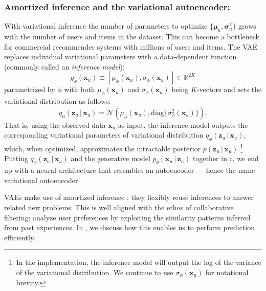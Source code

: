 \documentclass[sigconf]{acmart}
\newcommand{\mathbold}[1]{\ensuremath{\boldsymbol{\mathbf{#1}}}}
\DeclareRobustCommand{\mb}[1]{\ensuremath{\boldsymbol{\mathbf{#1}}}}
\newcommand{\mbx}{\mathbold{x}}
\newcommand{\mbz}{\mathbold{z}}
\newcommand{\g}{\,\vert\,}
\newcommand{\cN}{\mathcal{N}}
\DeclareRobustCommand{\mb}[1]{\mathbold{#1}}
\begin{document}
\subsubsection{Amortized inference and the variational autoencoder:} 
With variational inference the number of parameters to optimize $\{\mb\mu_u, \mb\sigma_u^2\}$ grows with the 
number of users and items in the dataset. This can become a bottleneck for commercial 
recommender systems with millions of users and items. The \gls{VAE} \citep{kingma2013auto,rezende2014stochastic} replaces individual variational 
parameters with a data-dependent function (commonly called an \emph{inference model}):
\[
g_\phi(\mbx_u) \equiv [\mu_\phi(\mbx_u), \sigma_\phi(\mbx_u)] \in \mathbb{R}^{2K} 
\]
parametrized by $\phi$ with both $\mu_\phi(\mbx_u)$ and $\sigma_\phi(\mbx_u)$ being $K$-vectors and sets the variational distribution as follows:
\[
q_\phi(\mbz_u \g \mbx_u) = \cN(\mu_\phi(\mbx_u), \mathrm{diag}\{\sigma_\phi^2(\mbx_u)\}).
\]
That is, using the observed data $\mbx_u$ as input, the inference model outputs the corresponding 
variational parameters of variational distribution $q_\phi(\mbz_u \g \mbx_u)$, which, when 
optimized, approximates the intractable posterior $p(\mbz_u \g \mbx_u)$.\footnote{In the implementation, the inference 
model will output the log of the variance of the variational distribution. 
We continue to use $\sigma_\phi(\mbx_u)$ for notational brevity.} 
Putting $q_\phi(\mbz_u \g \mbx_u)$ and the generative model $p_\theta(\mbx_u \g \mbz_u)$ together in c, we end up 
with a neural architecture that resembles an autoencoder --- hence the name variational autoencoder. 

\Glspl{VAE} make use of amortized inference \citep{gershman2014amortized}: they flexibly reuse inferences
to answer related new problems. This is well aligned with the ethos of collaborative 
filtering: analyze user preferences by exploiting the similarity patterns inferred from 
past experiences. In , we discuss how this enables us to perform prediction efficiently. 
\end{document}
